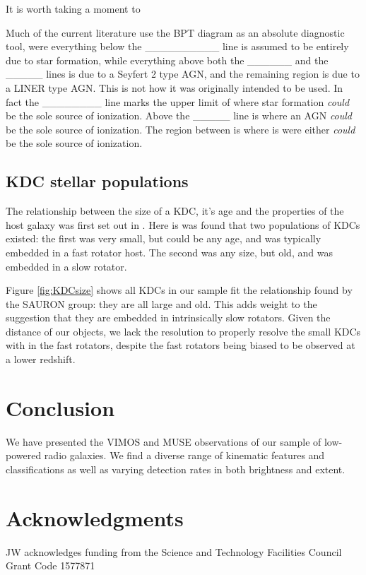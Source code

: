 \documentclass[fleqn,usenatbib,useAMS]{mnras}
\begin{document}
	It is worth taking a moment to 

	Much of the current literature use the BPT diagram as an absolute diagnostic tool, were everything below the \_\_\_\_\_\_\_\_\_\_ line is assumed to be entirely due to star formation, while everything above both the \_\_\_\_\_\_ and the \_\_\_\_\_ lines is due to a Seyfert 2 type AGN, and the remaining region is due to a LINER type AGN. This is not how it was originally intended to be used. In fact the \_\_\_\_\_\_\_\_ line marks the upper limit of where star formation \textit{could} be the sole source of ionization. Above the \_\_\_\_\_ line is where an AGN \textit{could} be the sole source of ionization. The region between is where is were either \textit{could} be the sole source of ionization. 







	\subsection{KDC stellar populations}
	\label{subsec:KDCsize}
	The relationship between the size of a KDC, it's age and the properties of the host galaxy was first set out in \citet{McDermid2006}. Here is was found that two populations of KDCs existed: the first was very small, but could be any age, and was typically embedded in a fast rotator host. The second was any size, but old, and was embedded in a slow rotator.  


	Figure \ref{fig:KDCsize} shows all KDCs in our sample fit the relationship found by the SAURON group: they are all large and old. This adds weight to the suggestion that they are embedded in intrinsically slow rotators. Given the distance of our objects, we lack the resolution to properly resolve the small KDCs with in the fast rotators, despite the fast rotators being biased to be observed at a lower redshift.



\section{Conclusion}
	\label{sec:conc}
	We have presented the VIMOS and MUSE observations of our sample of low-powered radio galaxies. We find a diverse range of kinematic features and classifications as well as varying detection rates in both brightness and extent. 



\section*{Acknowledgments}
JW acknowledges funding from the Science and Technology Facilities Council Grant Code 1577871
\end{document}
